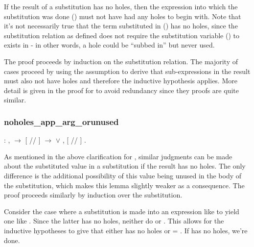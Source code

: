 \documentclass[12pt]{report}
\begin{document}
If the result of a substitution has no holes, then the expression
into which the substitution was done () must not have
had any holes to begin with. Note that it's not necessarily true that
the term substituted in () has no holes, since the
substitution relation as defined does not require the substitution
variable () to exists in  - in other
words, a hole could be ``subbed in'' but never used.


The proof proceeds by induction on the substitution relation. The
majority of cases proceed by using the  assumption
to derive that sub-expressions in the result must also not have holes
and therefore the inductive hypothesis applies. More detail is given
in the proof for  to avoid
redundancy since they proofs are quite similar. 

\subsubsection{noholes\_app\_arg\_orunused}

\begin{coqdoccode}
\coqdocemptyline
\coqdocindent{1.00em}
  : \coqdockw{\ensuremath{\forall}}    ,\coqdoceol
\coqdocindent{1.00em}
  \ensuremath{\rightarrow}\coqdoceol
\coqdocindent{1.00em}
[ // ]    \ensuremath{\rightarrow}\coqdoceol
\coqdocindent{1.00em}
  \ensuremath{\lor} \coqdockw{\ensuremath{\forall}} , [ // ]   .\coqdoceol
\coqdocemptyline
\end{coqdoccode}

As mentioned in the above clarification for ,
similar judgments can be made about the substituted value in
a substitution if the result has no holes. The only difference is the
additional possibility of this value being unused in the body of the
substitution, which makes this lemma slightly weaker as
a consequence. The proof proceeds similarly by induction over the
substitution. 

Consider the case where a substitution is made into an expression
like    to yield one
like   . Since the
latter has no holes, neither do  or
. This allows for the inductive hypotheses to give
that either  has no holes or 
= . If  has no holes, we're done.
\end{document}
